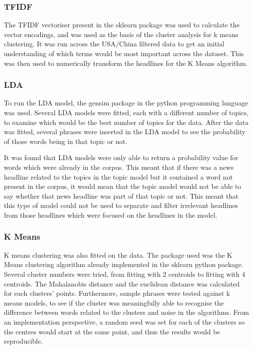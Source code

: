 \subsubsection{TFIDF}
The TFIDF vectoriser present in the sklearn package was used to calculate the vector encodings, and was used as the basis of the cluster analysis for k means clustering. It was run across the USA/China filtered data to get an initial understanding of which terms would be most important across the dataset. This was then used to numerically transform the headlines for the K Means algorithm. 

\subsubsection{LDA}
To run the LDA model, the gensim package in the python programming language was used. Several LDA models were fitted, each with a different number of topics, to examine which would be the best number of topics for the data. After the data was fitted, several phrases were inserted in the LDA model to see the probability of those words being in that topic or not. 

It was found that LDA models were only able to return a probability value for words which were already in the corpus. This meant that if there was a news headline related to the topics in the topic model but it contained a word not present in the corpus, it would mean that the topic model would not be able to say whether that news headline was part of that topic or not. This meant that this type of model could not be used to separate and filter irrelevant headlines from those headlines which were focused on the headlines in the model. 

\subsubsection{K Means}
K means clustering was also fitted on the data. The package used was the K Means clustering algorithm already implemented in the sklearn python package. Several cluster numbers were tried, from fitting with 2 centroids to fitting with 4 centroids. The Mahalanobis distance and the euclidean distance was calculated for each clusters' points. Furthermore, sample phrases were tested against k means models, to see if the cluster was meaningfully able to recognise the difference between words related to the clusters and noise in the algorithms. From an implementation perspective, a random seed was set for each of the clusters so the centres would start at the same point, and thus the results would be reproducible. 


